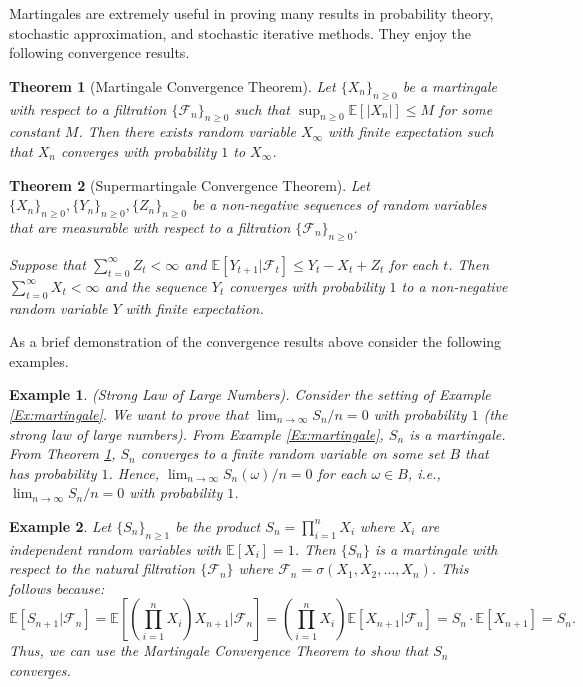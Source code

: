 \documentclass[letter,11pt]{article}
\newtheorem{theorem}{Theorem}[section]
\newtheorem{example}{Example}[section]
\begin{document}
Martingales are extremely useful in proving many results in probability theory, stochastic approximation, and stochastic iterative methods. They enjoy the following convergence results. 

\begin{theorem}[Martingale Convergence Theorem] \label{Thm:Mart}
Let \( \{X_n\}_{n \geq 0} \) be a martingale with respect to a filtration \( \{\mathcal{F}_n\}_{n \geq 0} \) such that \( \sup_{n \geq 0} \mathbb{E}[|X_n|] \leq M \) for some constant $M$. Then there exists random variable \( X_\infty \) with finite expectation such that \( X_n \) converges with probability $1$ to \( X_\infty \). 
\end{theorem}

\begin{theorem}[Supermartingale Convergence Theorem] \label{Thm:SuperMart}
Let \( \{X_n\}_{n \geq 0}, \{Y_n\}_{n \geq 0}, \{Z_n\}_{n \geq 0} \) be a non-negative sequences of random variables that are measurable with respect to a filtration \( \{\mathcal{F}_n\}_{n \geq 0} \). 


Suppose that $\sum_{t=0}^{\infty} Z_{t}  < \infty$ and $\mathbb{E}[Y_{t+1}|\mathcal{F}_{t}] \leq Y_{t} - X_{t} + Z_{t}$ for each $t$. Then $\sum _{t=0}^{\infty} X_{t} < \infty$ and the sequence $Y_{t}$ converges with probability $1$ to a non-negative random variable $Y$ with finite expectation. 

\end{theorem}

As a brief demonstration of the convergence results above consider the following examples.


\begin{example} (Strong Law of Large Numbers). \label{Example:LLN}
    Consider the setting of Example \ref{Ex:martingale}. We want to prove that $\lim _{n \rightarrow \infty} S_{n}/n = 0$ with probability $1$  (the strong law of large numbers). From Example \ref{Ex:martingale}, $S_{n}$ is a martingale. From Theorem \ref{Thm:Mart}, $S_{n}$ converges to a finite random variable on some set $B$ that has probability $1$. Hence, $ \lim _{n \rightarrow \infty} S_{n} (\omega) /n = 0$  for each $\omega \in B$, i.e.,  $\lim _{n \rightarrow \infty} S_{n}/n = 0$ with probability $1$.
\end{example}

    
\begin{example} \label{Ex:product_martingale}
Let \( \{S_n\}_{n \geq 1} \) be the product \( S_n = \prod_{i=1}^n X_i \) where \( X_i \) are independent random variables with \(\mathbb{E}[X_i] = 1\). Then \( \{S_n\} \) is a martingale with respect to the natural filtration \( \{\mathcal{F}_n\} \) where \( \mathcal{F}_n = \sigma(X_1, X_2, \ldots, X_n) \). This follows because:
\[
\mathbb{E}[S_{n+1} | \mathcal{F}_n] = \mathbb{E}\left[\left(\prod_{i=1}^n X_i\right) X_{n+1} \Bigg| \mathcal{F}_n\right] = \left(\prod_{i=1}^n X_i\right) \mathbb{E}[X_{n+1} | \mathcal{F}_n] = S_n \cdot \mathbb{E}[X_{n+1}] = S_n.
\]
Thus, we can use the Martingale Convergence Theorem to show that $S_{n}$ converges. 
\end{example}
\end{document}
